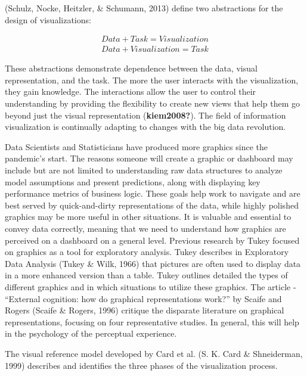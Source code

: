 \documentclass[print]{nuthesis}
\begin{document}
(Schulz, Nocke, Heitzler, \& Schumann, 2013) define two abstractions for the design of visualizations:

\begin{center}
\begin{align*}
  Data + Task = Visualization \\
  Data + Visualization = Task
\end{align*}
\end{center}

These abstractions demonstrate dependence between the data, visual representation, and the task. The more the user interacts with the visualization, they gain knowledge. The interactions allow the user to control their understanding by providing the flexibility to create new views that help them go beyond just the visual representation (\textbf{kiem2008?}). The field of information visualization is continually adapting to changes with the big data revolution.

Data Scientists and Statisticians have produced more graphics since the pandemic's start. The reasons someone will create a graphic or dashboard may include but are not limited to understanding raw data structures to analyze model assumptions and present predictions, along with displaying key performance metrics of business logic. These goals help work to navigate and are best served by quick-and-dirty representations of the data, while highly polished graphics may be more useful in other situations. It is valuable and essential to convey data correctly, meaning that we need to understand how graphics are perceived on a dashboard on a general level. Previous research by Tukey focused on graphics as a tool for exploratory analysis. Tukey describes in Exploratory Data Analysis (Tukey \& Wilk, 1966) that pictures are often used to display data in a more enhanced version than a table. Tukey outlines detailed the types of different graphics and in which situations to utilize these graphics. The article - ``External cognition: how do graphical representations work?'' by Scaife and Rogers (Scaife \& Rogers, 1996) critique the disparate literature on graphical representations, focusing on four representative studies. In general, this will help in the psychology of the perceptual experience.

The visual reference model developed by Card et al. (S. K. Card \& Shneiderman, 1999) describes and identifies the three phases of the visualization process.
\end{document}
